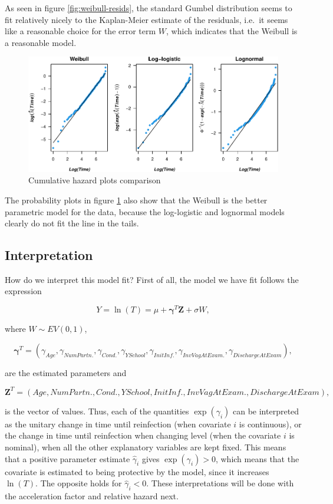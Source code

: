 \documentclass[
]{article}
\begin{document}
As seen in figure \ref{fig:weibull-resids}, the standard Gumbel distribution seems to fit relatively nicely to the Kaplan-Meier estimate of the residuals, i.e.~it seems like a reasonable choice for the error term \(W\), which indicates that the Weibull is a reasonable model.

\begin{figure}
\centering
\includegraphics{practical_files/figure-latex/cumhaz-plot-1.pdf}
\caption{\label{fig:cumhaz-plot}Cumulative hazard plots comparison}
\end{figure}

The probability plots in figure \ref{fig:cumhaz-plot} also show that the Weibull is the better parametric model for the data, because the log-logistic and lognormal models clearly do not fit the line in the tails.

\hypertarget{interpretation}{%
\subsection{Interpretation}\label{interpretation}}

How do we interpret this model fit? First of all, the model we have fit follows the expression

\[
Y = \ln(T) = \mu + \mathbf{\gamma}^T\mathbf{Z} + \sigma W,  
\]

where \(W \sim EV(0,1)\),

\[
\mathbf{\gamma}^T = (\gamma_{Age}, \gamma_{NumPartn.}, \gamma_{Cond.}, \gamma_{YSchool}, \gamma_{InitInf.}, \gamma_{InvVagAtExam.}, \gamma_{DischargeAtExam}),
\]

are the estimated parameters and

\[
\mathbf{Z}^T = (Age, NumPartn., Cond., YSchool, InitInf., InvVagAtExam., DischargeAtExam), 
\]

is the vector of values. Thus, each of the quantities \(\exp(\gamma_i)\) can be interpreted as the unitary change in time until reinfection (when covariate \(i\) is continuous), or the change in time until reinfection when changing level (when the covariate \(i\) is nominal), when all the other explanatory variables are kept fixed. This means that a positive parameter estimate \(\hat{\gamma}_i\) gives \(\exp(\gamma_i) > 0\), which means that the covariate is estimated to being protective by the model, since it increases \(\ln(T)\). The opposite holds for \(\hat{\gamma}_i < 0\). These interpretations will be done with the acceleration factor and relative hazard next.
\end{document}
